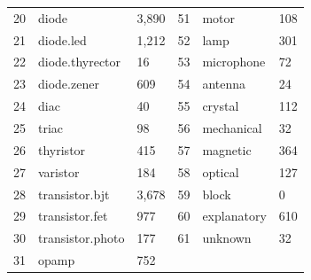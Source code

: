 \begin{table}[H]
\begin{tabular}{rll|rll}
        20 & diode & 3,890 & 51 & motor & 108 \\
        21 & diode.led & 1,212 & 52 & lamp & 301 \\
        22 & diode.thyrector & 16 & 53 & microphone & 72 \\
        23 & diode.zener & 609 & 54 & antenna & 24 \\
        24 & diac & 40 & 55 & crystal & 112 \\
        25 & triac & 98 & 56 & mechanical & 32 \\
        26 & thyristor & 415 & 57 & magnetic & 364 \\
        27 & varistor & 184 & 58 & optical & 127 \\
        28 & transistor.bjt & 3,678 & 59 & block & 0 \\
        29 & transistor.fet & 977 & 60 & explanatory & 610 \\
        30 & transistor.photo & 177 & 61 & unknown & 32 \\
        31 & opamp & 752 &  &  &  \\
        \bottomrule
    \end{tabular}
\end{table}

